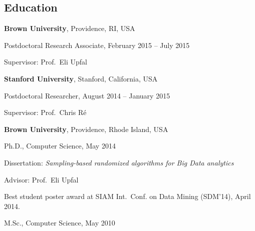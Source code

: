 \documentclass[margin,line]{resume}
\begin{document}
\begin{resume}
\section{\sc Education}
{\bf Brown University}, Providence, RI, USA\\
\vspace*{-.18in}
\begin{list1}
\item[] Postdoctoral Research Associate, February 2015 -- July 2015
\begin{list2}
\item Supervisor: Prof.~Eli Upfal
\end{list2}
\end{list1}
{\bf Stanford University}, Stanford, California, USA\\
\vspace*{-.18in}
\begin{list1}
\item[] Postdoctoral Researcher, August 2014 -- January 2015
\begin{list2}
\item Supervisor: Prof.~Chris R\'e
\end{list2}
\end{list1}

{\bf Brown University}, Providence, Rhode Island, USA\\
\vspace*{-.18in}
\begin{list1}
\item[] Ph.D., Computer Science, May 2014
\begin{list2}
\item Dissertation: {\em Sampling-based randomized algorithms for Big Data analytics}
\item Advisor: Prof.~Eli Upfal
\item Best student poster award at SIAM Int.~Conf. on Data Mining (SDM'14), April 2014.
\end{list2}
\item[] M.Sc., Computer Science, May 2010
\end{list1}


\end{resume}
\end{document}
